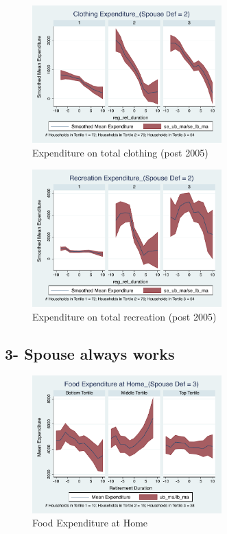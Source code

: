 \documentclass[11pt,onecolumn]{article}
\numberwithin{figure}{section}
\begin{document}
\begin{figure}[h]
	\caption{Expenditure on total clothing (post 2005)}
	\centering
	\includegraphics[width=0.65\textwidth]{../ConsumptionPostRetirement_by_SpouseDef_Cats/Smoothed/2/spouse_def_total_clothing_2005_real.pdf}
\end{figure}

\begin{figure}[h]
	\caption{Expenditure on total recreation (post 2005)}
	\centering
	\includegraphics[width=0.65\textwidth]{../ConsumptionPostRetirement_by_SpouseDef_Cats/Smoothed/2/spouse_def_total_recreation_2005_real.pdf}
\end{figure}

\clearpage

\subsection{3- Spouse always works}

\begin{figure}[h]
	\caption{Food Expenditure at Home}
	\centering
	\includegraphics[width=0.65\textwidth]{../ConsumptionPostRetirement_by_SpouseDef_Cats/Smoothed/3/spouse_def_total_foodexp_home_real.pdf}
\end{figure}
\end{document}
